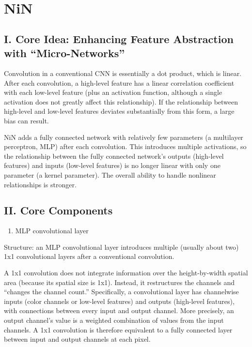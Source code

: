 \setcounter{section}{1}

\hypertarget{nin}{%
\section{NiN}\label{nin}}

\hypertarget{i.-core-idea-enhancing-feature-abstraction-with-micro-networks}{%
\subsection{I. Core Idea: Enhancing Feature Abstraction with ``Micro-Networks''}\label{i.-core-idea-enhancing-feature-abstraction-with-micro-networks}}

Convolution in a conventional CNN is essentially a dot product, which is linear. After each convolution, a high-level feature has a linear correlation coefficient with each low-level feature (plus an activation function, although a single activation does not greatly affect this relationship). If the relationship between high-level and low-level features deviates substantially from this form, a large bias can result.

NiN adds a fully connected network with relatively few parameters (a multilayer perceptron, MLP) after each convolution. This introduces multiple activations, so the relationship between the fully connected network's outputs (high-level features) and inputs (low-level features) is no longer linear with only one parameter (a kernel parameter). The overall ability to handle nonlinear relationships is stronger.

\hypertarget{ii.-core-components-1}{%
\subsection{II. Core Components}\label{ii.-core-components-1}}

\begin{enumerate}
\def\labelenumi{\arabic{enumi}.}
\tightlist
\item
  MLP convolutional layer
\end{enumerate}

Structure: an MLP convolutional layer introduces multiple (usually about two) 1x1 convolutional layers after a conventional convolution.

A 1x1 convolution does not integrate information over the height-by-width spatial area (because its spatial size is 1x1). Instead, it restructures the channels and ``changes the channel count.'' Specifically, a convolutional layer has channelwise inputs (color channels or low-level features) and outputs (high-level features), with connections between every input and output channel. More precisely, an output channel's value is a weighted combination of values from the input channels. A 1x1 convolution is therefore equivalent to a fully connected layer between input and output channels at each pixel.

